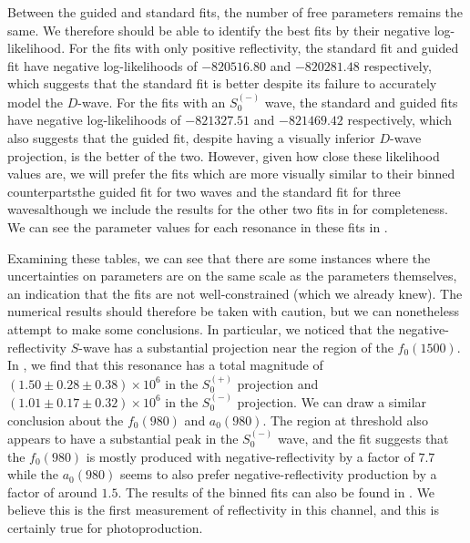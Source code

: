 Between the guided and standard fits, the number of free parameters remains the same. We therefore should be able to identify the best fits by their negative log-likelihood. For the fits with only positive reflectivity, the standard fit and guided fit have negative log-likelihoods of $-820516.80$ and $-820281.48$ respectively, which suggests that the standard fit is better despite its failure to accurately model the $D$-wave. For the fits with an $S_0^{(-)}$ wave, the standard and guided fits have negative log-likelihoods of $-821327.51$ and $-821469.42$ respectively, which also suggests that the guided fit, despite having a visually inferior $D$-wave projection, is the better of the two. However, given how close these likelihood values are, we will prefer the fits which are more visually similar to their binned counterparts\textemdash the guided fit for two waves and the standard fit for three waves\textemdash although we include the results for the other two fits in  for completeness. We can see the parameter values for each resonance in these fits in .

Examining these tables, we can see that there are some instances where the uncertainties on parameters are on the same scale as the parameters themselves, an indication that the fits are not well-constrained (which we already knew). The numerical results should therefore be taken with caution, but we can nonetheless attempt to make some conclusions. In particular, we noticed that the negative-reflectivity $S$-wave has a substantial projection near the region of the $f_0(1500)$. In , we find that this resonance has a total magnitude of $(1.50 \pm 0.28 \pm 0.38) \times 10^6$ in the $S_0^{(+)}$ projection and $(1.01 \pm 0.17 \pm 0.32) \times 10^6$ in the $S_0^{(-)}$ projection. We can draw a similar conclusion about the $f_0(980)$ and $a_0(980)$. The region at threshold also appears to have a substantial peak in the $S_0^{(-)}$ wave, and the fit suggests that the $f_0(980)$ is mostly produced with negative-reflectivity by a factor of $7.7$ while the $a_0(980)$ seems to also prefer negative-reflectivity production by a factor of around $1.5$. The results of the binned fits can also be found in . We believe this is the first measurement of reflectivity in this channel, and this is certainly true for photoproduction.

